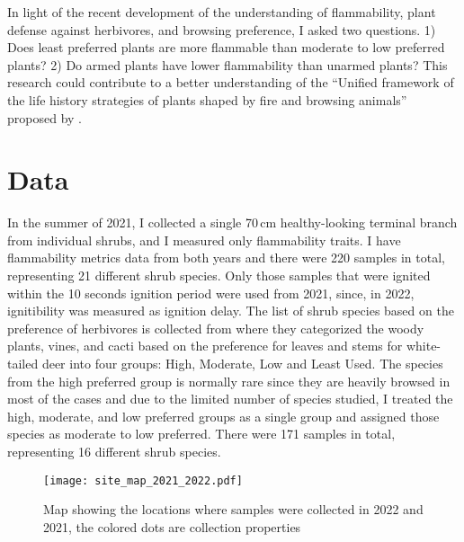 \documentclass[12pt]{report}
\begin{document}
In light of the recent development of the understanding of flammability, plant defense against herbivores, and browsing preference, I asked two questions. 1) Does least preferred plants are more flammable than moderate to low preferred plants?  2) Do armed plants have lower flammability than unarmed plants? This research could contribute to a better understanding of the ``Unified framework of the life history strategies of plants shaped by fire and browsing animals'' proposed by \citep{archibald2019unified}.



\section{Data}

In the summer of 2021, I collected a single 70\,cm healthy-looking terminal branch from individual shrubs, and I measured only flammability traits.  I have flammability metrics data from both years and there were 220 samples in total, representing 21 different shrub species. Only those samples that were ignited within the 10 seconds ignition period were used from 2021, since, in 2022, ignitibility was measured as ignition delay. The list of shrub species based on the preference of herbivores is collected from \citep{wright2003white} where they categorized the woody plants, vines, and cacti based on the preference for leaves and stems for white-tailed deer into four groups: High, Moderate, Low and Least Used. The species from the high preferred group is normally rare since they are heavily browsed in most of the cases and due to the limited number of species studied, I treated the high, moderate, and low preferred groups as a single group and assigned those species as moderate to low preferred. There were 171 samples in total, representing 16 different shrub species.

\begin{figure}
    \centering
    \texttt{[image: site\_map\_2021\_2022.pdf]}
    \caption{Map showing the locations where samples were collected in 2022 and 2021,
    the colored dots are collection properties}
\end{figure}
\end{document}
